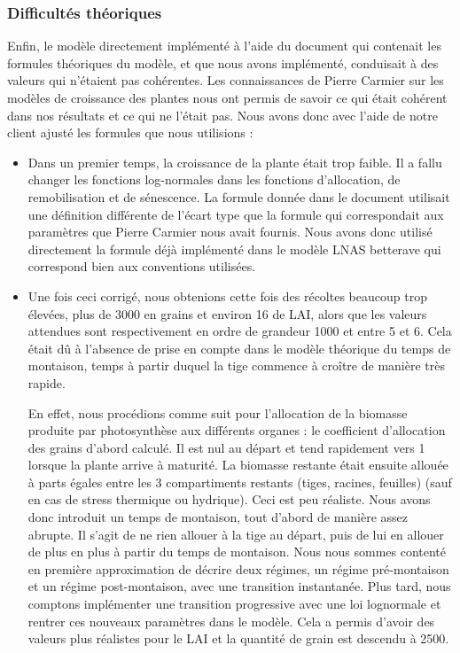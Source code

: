 \subsubsection{Difficultés théoriques}
Enfin, le modèle directement implémenté à l'aide du document qui contenait les formules théoriques du modèle, et que nous avons implémenté, conduisait à des valeurs qui n'étaient pas cohérentes. Les connaissances de Pierre Carmier sur les modèles de croissance des plantes nous ont permis de savoir ce qui était cohérent dans nos résultats et ce qui ne l'était pas. 
Nous avons donc avec l'aide de notre client ajusté les formules que nous utilisions :  
\begin{itemize}
	\item Dans un premier temps, la croissance de la plante était trop faible. Il a fallu changer les fonctions log-normales dans les fonctions d'allocation, de remobilisation et de sénescence. 
La formule donnée dans le document  utilisait une définition différente de l'écart type que la formule qui correspondait aux paramètres que Pierre Carmier nous avait fournis. Nous avons donc utilisé directement la formule déjà implémenté dans le modèle LNAS betterave qui correspond bien aux conventions utilisées.
	\item Une fois ceci corrigé, nous obtenions cette fois des récoltes beaucoup trop élevées, plus de 3000 en grains et environ 16 de LAI, alors que les valeurs attendues sont respectivement en ordre de grandeur 1000 et entre 5 et 6.
Cela était dû à l'absence de prise en compte dans le modèle théorique du temps de montaison, temps à partir duquel la tige commence à croître de manière très rapide.

En effet, nous procédions comme suit pour l'allocation de la biomasse produite par photosynthèse aux différents organes : le coefficient d'allocation des grains d'abord calculé. Il est nul au départ et tend rapidement vers 1 lorsque la plante arrive à maturité. La biomasse restante était ensuite allouée à parts égales entre les 3 compartiments restants (tiges, racines, feuilles) (sauf en cas de stress thermique ou hydrique). Ceci est peu réaliste.
Nous avons donc introduit un temps de montaison, tout d'abord de manière assez abrupte. 
Il s'agit de ne rien allouer à la tige au départ, puis de lui en allouer de plus en plus à partir du temps de montaison. Nous nous sommes contenté en première approximation de décrire deux régimes, un régime pré-montaison et un régime post-montaison, avec une transition instantanée. Plus tard, nous comptons implémenter une transition progressive avec une loi lognormale et rentrer ces nouveaux paramètres dans le modèle.
Cela a permis d'avoir des valeurs plus réalistes pour le LAI et la quantité de grain est descendu à 2500.


\end{itemize}
